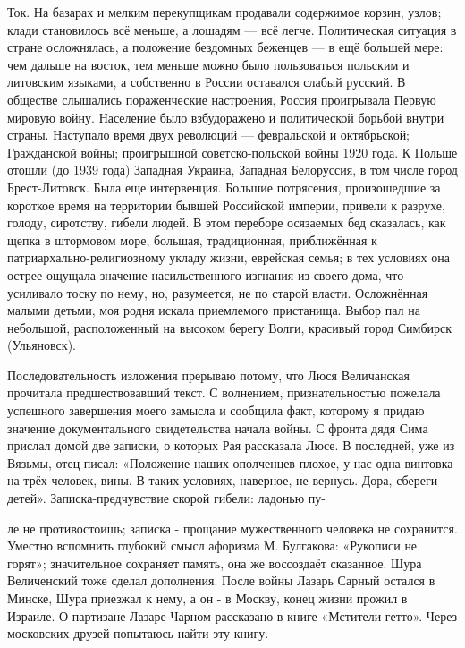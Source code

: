 Ток. На базарах и мелким перекупщикам продавали содержимое корзин, узлов; клади становилось всё меньше, а лошадям — всё легче. Политическая ситуация в стране осложнялась, а положение бездомных беженцев — в ещё большей мере: чем дальше на восток, тем меньше можно было пользоваться польским и литовским языками, а собственно в России оставался слабый русский. В обществе слышались пораженческие настроения, Россия проигрывала Первую мировую войну. Население было взбудоражено и политической борьбой внутри страны. Наступало время двух революций — февральской и октябрьской; Гражданской войны; проигрышной советско-польской войны 1920 года. К Польше отошли (до 1939 года) Западная Украина, Западная Белоруссия, в том числе город Брест-Литовск. Была еще интервенция. Большие потрясения, произошедшие за короткое время на территории бывшей Российской империи, привели к разрухе, голоду, сиротству, гибели людей. В этом переборе осязаемых бед сказалась, как щепка в штормовом море, большая, традиционная, приближённая к патриархально-религиозному укладу жизни, еврейская семья; в тех условиях она острее ощущала значение насильственного изгнания из своего дома, что усиливало тоску по нему, но, разумеется, не по старой власти. Осложнённая малыми детьми, моя родня искала приемлемого пристанища. Выбор пал на небольшой, расположенный на высоком берегу Волги, красивый город Симбирск (Ульяновск).

Последовательность изложения прерываю потому, что Люся Величанская прочитала предшествовавший текст. С волнением, признательностью пожелала успешного завершения моего замысла и сообщила факт, которому я придаю значение документального свидетельства начала войны. С фронта дядя Сима прислал домой две записки, о которых Рая рассказала Люсе. В последней, уже из Вязьмы, отец писал: «Положение наших ополченцев плохое, у нас одна винтовка на трёх человек, вины. В таких условиях, наверное, не вернусь. Дора, сбереги детей». Записка-предчувствие скорой гибели: ладонью пу-

ле не противостоишь; записка - прощание мужественного человека не сохранится. Уместно вспомнить глубокий смысл афоризма М. Булгакова: «Рукописи не горят»; значительное сохраняет память, она же воссоздаёт сказанное. Шура Величенский тоже сделал дополнения. После войны Лазарь Сарный остался в Минске, Шура приезжал к нему, а он - в Москву, конец жизни прожил в Израиле. О партизане Лазаре Чарном рассказано в книге «Мстители гетто». Через московских друзей попытаюсь найти эту книгу.